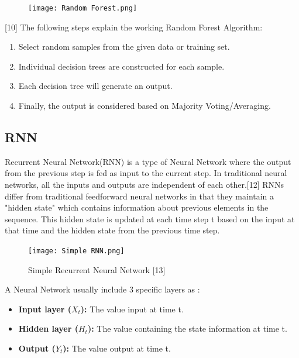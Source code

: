 \documentclass{ieeeojies}
\begin{document}
\begin{figure}[H]
    \centering
    \begin{minipage}{0.5\textwidth}
        \centering
        \texttt{[image: Random Forest.png]}
    \end{minipage}
\end{figure}

[10] The following steps explain the working Random Forest Algorithm:
\begin{enumerate}
  \item Select random samples from the given data or training set.
  \item Individual decision trees are constructed for each sample.
  \item Each decision tree will generate an output.
  \item Finally, the output is considered based on Majority Voting/Averaging.
\end{enumerate}

\subsection{RNN}
Recurrent Neural Network(RNN) is a type of Neural Network where the output from the previous step is fed as input to the current step. In traditional neural networks, all the inputs and outputs are independent of each other.[12] RNNs differ from traditional feedforward neural networks in that they maintain a "hidden state" which contains information about previous elements in the sequence. This hidden state is updated at each time step t based on the input at that time and the hidden state from the previous time step.
\begin{figure}[H]
    \centering
    \begin{minipage}{0.23\textwidth}
    \centering
    \texttt{[image: Simple RNN.png]}
    \caption{Simple Recurrent Neural Network [13]}
    \label{fig:1}
    \end{minipage}
\end{figure}
A Neural Network usually include 3 specific layers as :
\begin{itemize}
    \item \textbf{Input layer (\(X_t\)): } The value input at time t.
\end{itemize}
\begin{itemize}
    \item \textbf{Hidden layer (\(H_t\)):  } The value containing the state information at time t.
\end{itemize}
\begin{itemize}
    \item \textbf{Output (\(Y_t\)):  } The value output at time t.
\end{itemize}
\end{document}
